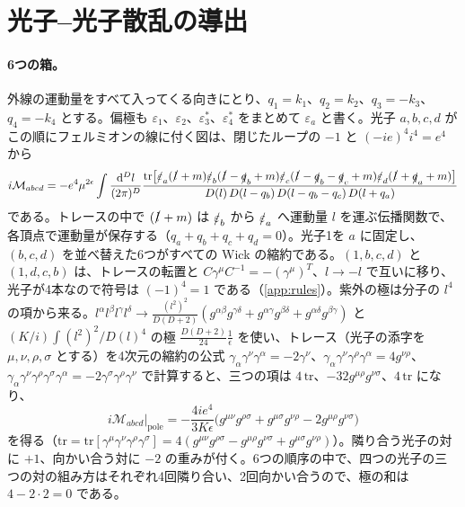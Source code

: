 \documentclass[a4paper,10pt]{ltjsarticle}
\newcommand{\dd}{\mathrm{d}}
\begin{document}
\section{光子--光子散乱の導出}\label{app:lbl}

\paragraph{6つの箱。}外線の運動量をすべて入ってくる向きにとり、$q_1=k_1$、$q_2=k_2$、$q_3=-k_3$、$q_4=-k_4$ とする。偏極も $\varepsilon_1$、$\varepsilon_2$、$\varepsilon_3^*$、$\varepsilon_4^*$ をまとめて $\varepsilon_a$ と書く。光子 $a,b,c,d$ がこの順にフェルミオンの線に付く図は、閉じたループの $-1$ と $(-ie)^4i^4=e^4$ から
\begin{equation*}
i\mathcal M_{abcd}=-e^4\mu^{2\epsilon}\int\frac{\dd^Dl}{(2\pi)^D}\frac{\mathrm{tr}\bigl[\slashed\varepsilon_a(\slashed l+m)\slashed\varepsilon_b(\slashed l-\slashed q_b+m)\slashed\varepsilon_c(\slashed l-\slashed q_b-\slashed q_c+m)\slashed\varepsilon_d(\slashed l+\slashed q_a+m)\bigr]}{D(l)\,D(l-q_b)\,D(l-q_b-q_c)\,D(l+q_a)}
\end{equation*}
である。トレースの中で $(\slashed l+m)$ は $\slashed\varepsilon_b$ から $\slashed\varepsilon_a$ へ運動量 $l$ を運ぶ伝播関数で、各頂点で運動量が保存する（$q_a+q_b+q_c+q_d=0$）。光子1を $a$ に固定し、$(b,c,d)$ を並べ替えた6つがすべての Wick の縮約である。$(1,b,c,d)$ と $(1,d,c,b)$ は、トレースの転置と $C\gamma^\mu C^{-1}=-(\gamma^\mu)^T$、$l\to-l$ で互いに移り、光子が4本なので符号は $(-1)^4=1$ である（\ref{app:rules}）。紫外の極は分子の $l^4$ の項から来る。$l^\alpha l^\beta l^\gamma l^\delta\to\frac{(l^2)^2}{D(D+2)}(g^{\alpha\beta}g^{\gamma\delta}+g^{\alpha\gamma}g^{\beta\delta}+g^{\alpha\delta}g^{\beta\gamma})$ と $(K/i)\int(l^2)^2/D(l)^4$ の極 $\frac{D(D+2)}{24}\frac1\epsilon$ を使い、トレース（光子の添字を $\mu,\nu,\rho,\sigma$ とする）を4次元の縮約の公式 $\gamma_\alpha\gamma^\nu\gamma^\alpha=-2\gamma^\nu$、$\gamma_\alpha\gamma^\nu\gamma^\rho\gamma^\alpha=4g^{\nu\rho}$、$\gamma_\alpha\gamma^\nu\gamma^\rho\gamma^\sigma\gamma^\alpha=-2\gamma^\sigma\gamma^\rho\gamma^\nu$ で計算すると、三つの項は $4\,\mathrm{tr}$、$-32g^{\mu\rho}g^{\nu\sigma}$、$4\,\mathrm{tr}$ になり、
\begin{equation*}
i\mathcal M_{abcd}\big|_{\mathrm{pole}}=-\frac{4ie^4}{3K\epsilon}\bigl(g^{\mu\nu}g^{\rho\sigma}+g^{\mu\sigma}g^{\nu\rho}-2g^{\mu\rho}g^{\nu\sigma}\bigr)
\end{equation*}
を得る（$\mathrm{tr}=\mathrm{tr}[\gamma^\mu\gamma^\nu\gamma^\rho\gamma^\sigma]=4(g^{\mu\nu}g^{\rho\sigma}-g^{\mu\rho}g^{\nu\sigma}+g^{\mu\sigma}g^{\nu\rho})$）。隣り合う光子の対に $+1$、向かい合う対に $-2$ の重みが付く。6つの順序の中で、四つの光子の三つの対の組み方はそれぞれ4回隣り合い、2回向かい合うので、極の和は $4-2\cdot2=0$ である。
\end{document}
